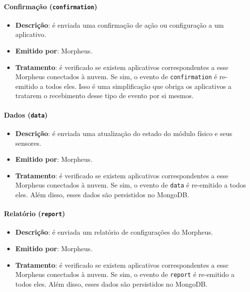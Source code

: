 \paragraph{Confirmação (\texttt{confirmation})}
\begin{itemize}
\item \textbf{Descrição}: é enviada uma confirmação de ação ou configuração a um aplicativo.
\item \textbf{Emitido por}: Morpheus.
\item \textbf{Tratamento}: é verificado se existem aplicativos correspondentes a esse Morpheus conectados à nuvem. Se sim, o evento de \texttt{confirmation} é re-emitido a todos eles. Isso é uma simplificação que obriga os aplicativos a tratarem o recebimento desse tipo de evento por si mesmos.
\end{itemize}

\paragraph{Dados (\texttt{data})}
\begin{itemize}
\item \textbf{Descrição}: é enviada uma atualização do estado do módulo físico e seus sensores.
\item \textbf{Emitido por}: Morpheus.
\item \textbf{Tratamento}: é verificado se existem aplicativos correspondentes a esse Morpheus conectados à nuvem. Se sim, o evento de \texttt{data} é re-emitido a todos eles. Além disso, esses dados são persistidos no MongoDB.
\end{itemize}

\paragraph{Relatório (\texttt{report})}
\begin{itemize}
\item \textbf{Descrição}: é enviada um relatório de configurações do Morpheus.
\item \textbf{Emitido por}: Morpheus.
\item \textbf{Tratamento}: é verificado se existem aplicativos correspondentes a esse Morpheus conectados à nuvem. Se sim, o evento de \texttt{report} é re-emitido a todos eles. Além disso, esses dados são persistidos no MongoDB.
\end{itemize}

